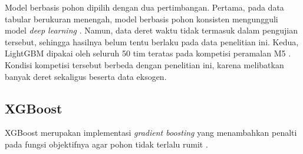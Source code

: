 Model berbasis pohon dipilih dengan dua pertimbangan. Pertama, pada data
tabular berukuran menengah, model berbasis pohon konsisten mengungguli model
\textit{deep learning} \cite{grinsztajn2022}. Namun, data deret waktu tidak termasuk dalam pengujian tersebut, sehingga hasilnya belum tentu berlaku pada data penelitian ini. Kedua, LightGBM dipakai oleh seluruh
50 tim teratas pada kompetisi peramalan M5 \cite{makridakis2022}. Kondisi
kompetisi tersebut berbeda dengan penelitian ini, karena melibatkan banyak
deret sekaligus beserta data eksogen.

\subsection{XGBoost}
XGBoost merupakan implementasi \textit{gradient boosting} yang menambahkan
penalti pada fungsi objektifnya agar pohon tidak terlalu rumit
\cite{chen2016}.

